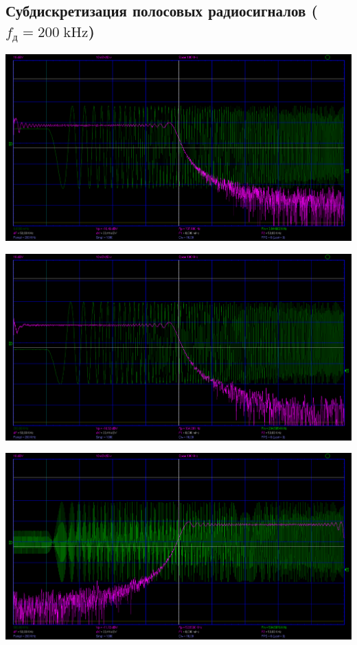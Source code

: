 \documentclass[12pt,a4paper]{article}
\begin{document}
\newpage

\subsection*{Субдискретизация полосовых радиосигналов ($f_{\text{д}} = 200 \;\text{kHz}$)}
\vspace*{20pt}
\begin{center}
	\includegraphics[width=.8\linewidth]{data/2-1_rect_0-50KHZ_200KHZ}\hfill
\end{center}	
\begin{center}
	\includegraphics[width=.8\linewidth]{data/2-1_rect_200-250KHZ_200KHZ}\hfill
\end{center}	
\begin{center}
	\includegraphics[width=.8\linewidth]{data/2-1_rect_500-550KHZ_200KHZ}\hfill
\end{center}	
\end{document}
